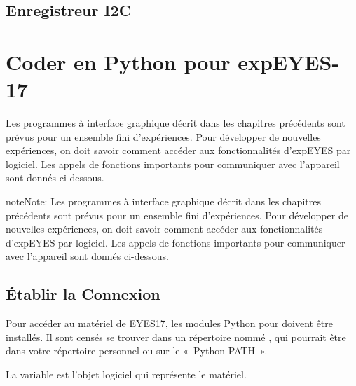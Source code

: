 \documentclass[a4paper,12pt,french]{sphinxmanual}
\begin{document}
\section{Enregistreur I2C}
\label{\detokenize{6.93:enregistreur-i2c}}\label{\detokenize{6.93::doc}}

\chapter{Coder en Python pour expEYES-17}
\label{\detokenize{index:coder-en-python-pour-expeyes-17}}
Les programmes à interface graphique décrit dans les chapitres
précédents sont prévus pour un ensemble fini d’expériences. Pour
développer de nouvelles expériences, on doit savoir comment accéder
aux fonctionnalités d’expEYES par logiciel. Les appels de fonctions
importants pour communiquer avec l’appareil sont donnés ci-dessous.

\begin{sphinxadmonition}{note}{Note:}
Les programmes à interface graphique décrit dans les chapitres
précédents sont prévus pour un ensemble fini d’expériences. Pour
développer de nouvelles expériences, on doit savoir comment accéder
aux fonctionnalités d’expEYES par logiciel. Les appels de fonctions
importants pour communiquer avec l’appareil sont donnés ci-dessous.
\end{sphinxadmonition}


\section{Établir la Connexion}
\label{\detokenize{7.1:etablir-la-connexion}}\label{\detokenize{7.1::doc}}
Pour accéder au matériel de EYES17, les modules Python pour 
doivent être installés. Il sont censés se trouver dans un répertoire
nommé , qui pourrait être dans votre répertoire personnel
ou sur le « Python PATH ».


\begin{sphinxVerbatim}[commandchars=\\\{\}]
 
  
\end{sphinxVerbatim}

La variable  est l’objet logiciel qui représente le matériel.
\end{document}
